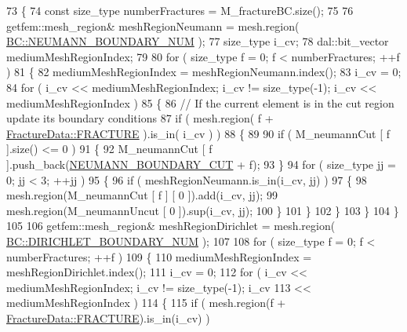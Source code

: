 \begin{DoxyCode}
73 \{
74     \textcolor{keyword}{const} size\_type numberFractures = M\_fractureBC.size();
75 
76     getfem::mesh\_region& meshRegionNeumann = mesh.region( 
      \hyperlink{classBC_ad1b507696802f73b95c0ca59f4c41390a432aa77a00d8eb4929463ef8d57b5c04}{BC::NEUMANN\_BOUNDARY\_NUM} );
77     size\_type i\_cv;
78     dal::bit\_vector mediumMeshRegionIndex;
79 
80     \textcolor{keywordflow}{for} ( size\_type f = 0; f < numberFractures; ++f )
81     \{
82         mediumMeshRegionIndex = meshRegionNeumann.index();
83         i\_cv = 0;
84         \textcolor{keywordflow}{for} ( i\_cv << mediumMeshRegionIndex; i\_cv != size\_type(-1); i\_cv << mediumMeshRegionIndex )
85         \{
86             \textcolor{comment}{// If the current element is in the cut region update its boundary conditions}
87             \textcolor{keywordflow}{if} ( mesh.region( f + \hyperlink{classFractureData_aaeea1f30482432d159eda9d98beb5e89a351538e4c78b34b5c0416e21903e1812}{FractureData::FRACTURE} ).is\_in( i\_cv ) )
88             \{
89 
90                 \textcolor{keywordflow}{if} ( M\_neumannCut [ f ].size() <= 0 )
91                 \{
92                     M\_neumannCut [ f ].push\_back(\hyperlink{classBCHandler_a2bc86209db0836dbc6ca56e1ca4e4ac1add7397a06718591b0c27c067225b1d5f}{NEUMANN\_BOUNDARY\_CUT} + f);
93                 \}
94                 \textcolor{keywordflow}{for} ( size\_type jj = 0; jj < 3; ++jj )
95                 \{
96                     \textcolor{keywordflow}{if} ( meshRegionNeumann.is\_in(i\_cv, jj) )
97                     \{
98                         mesh.region(M\_neumannCut [ f ] [ 0 ]).add(i\_cv, jj);
99                         mesh.region(M\_neumannUncut [ 0 ]).sup(i\_cv, jj);
100                     \}
101                 \}
102             \}
103         \}
104     \}
105 
106     getfem::mesh\_region& meshRegionDirichlet = mesh.region( 
      \hyperlink{classBC_ad1b507696802f73b95c0ca59f4c41390a99103ccd54ba29b1bd2670cc6cd0c462}{BC::DIRICHLET\_BOUNDARY\_NUM} );
107 
108     \textcolor{keywordflow}{for} ( size\_type f = 0; f < numberFractures; ++f )
109     \{
110         mediumMeshRegionIndex = meshRegionDirichlet.index();
111         i\_cv = 0;
112         \textcolor{keywordflow}{for} ( i\_cv << mediumMeshRegionIndex; i\_cv != size\_type(-1); i\_cv
113                 << mediumMeshRegionIndex )
114         \{
115             \textcolor{keywordflow}{if} ( mesh.region(f + \hyperlink{classFractureData_aaeea1f30482432d159eda9d98beb5e89a351538e4c78b34b5c0416e21903e1812}{FractureData::FRACTURE}).is\_in(i\_cv) )

\end{DoxyCode}
